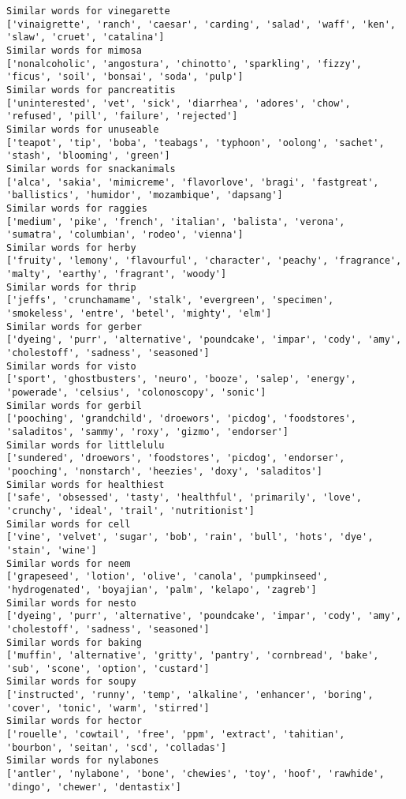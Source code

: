 \documentclass[11pt]{article}
\begin{document}
\begin{Verbatim}[commandchars=\\\{\}]
Similar words for vinegarette
['vinaigrette', 'ranch', 'caesar', 'carding', 'salad', 'waff', 'ken', 'slaw', 'cruet', 'catalina']
Similar words for mimosa
['nonalcoholic', 'angostura', 'chinotto', 'sparkling', 'fizzy', 'ficus', 'soil', 'bonsai', 'soda', 'pulp']
Similar words for pancreatitis
['uninterested', 'vet', 'sick', 'diarrhea', 'adores', 'chow', 'refused', 'pill', 'failure', 'rejected']
Similar words for unuseable
['teapot', 'tip', 'boba', 'teabags', 'typhoon', 'oolong', 'sachet', 'stash', 'blooming', 'green']
Similar words for snackanimals
['alca', 'sakia', 'mimicreme', 'flavorlove', 'bragi', 'fastgreat', 'ballistics', 'humidor', 'mozambique', 'dapsang']
Similar words for raggies
['medium', 'pike', 'french', 'italian', 'balista', 'verona', 'sumatra', 'columbian', 'rodeo', 'vienna']
Similar words for herby
['fruity', 'lemony', 'flavourful', 'character', 'peachy', 'fragrance', 'malty', 'earthy', 'fragrant', 'woody']
Similar words for thrip
['jeffs', 'crunchamame', 'stalk', 'evergreen', 'specimen', 'smokeless', 'entre', 'betel', 'mighty', 'elm']
Similar words for gerber
['dyeing', 'purr', 'alternative', 'poundcake', 'impar', 'cody', 'amy', 'cholestoff', 'sadness', 'seasoned']
Similar words for visto
['sport', 'ghostbusters', 'neuro', 'booze', 'salep', 'energy', 'powerade', 'celsius', 'colonoscopy', 'sonic']
Similar words for gerbil
['pooching', 'grandchild', 'droewors', 'picdog', 'foodstores', 'saladitos', 'sammy', 'roxy', 'gizmo', 'endorser']
Similar words for littlelulu
['sundered', 'droewors', 'foodstores', 'picdog', 'endorser', 'pooching', 'nonstarch', 'heezies', 'doxy', 'saladitos']
Similar words for healthiest
['safe', 'obsessed', 'tasty', 'healthful', 'primarily', 'love', 'crunchy', 'ideal', 'trail', 'nutritionist']
Similar words for cell
['vine', 'velvet', 'sugar', 'bob', 'rain', 'bull', 'hots', 'dye', 'stain', 'wine']
Similar words for neem
['grapeseed', 'lotion', 'olive', 'canola', 'pumpkinseed', 'hydrogenated', 'boyajian', 'palm', 'kelapo', 'zagreb']
Similar words for nesto
['dyeing', 'purr', 'alternative', 'poundcake', 'impar', 'cody', 'amy', 'cholestoff', 'sadness', 'seasoned']
Similar words for baking
['muffin', 'alternative', 'gritty', 'pantry', 'cornbread', 'bake', 'sub', 'scone', 'option', 'custard']
Similar words for soupy
['instructed', 'runny', 'temp', 'alkaline', 'enhancer', 'boring', 'cover', 'tonic', 'warm', 'stirred']
Similar words for hector
['rouelle', 'cowtail', 'free', 'ppm', 'extract', 'tahitian', 'bourbon', 'seitan', 'scd', 'colladas']
Similar words for nylabones
['antler', 'nylabone', 'bone', 'chewies', 'toy', 'hoof', 'rawhide', 'dingo', 'chewer', 'dentastix']

\end{Verbatim}
\end{document}
